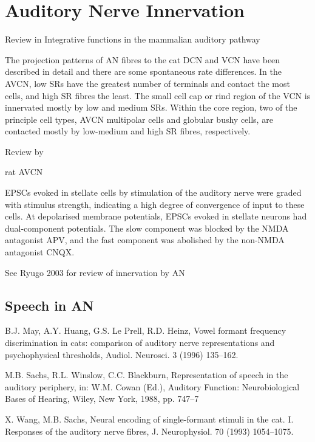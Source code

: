 \documentclass[10pt,a4paper]{article}
\begin{document}
\section{Auditory Nerve Innervation }

\citep{SmithSpirou:2002} 
Review in Integrative functions in the mammalian auditory pathway

The projection patterns of AN fibres to the cat DCN and VCN have been described in detail \citep{FeketeRouillerEtAl:1984,Liberman:1991,Liberman:1993,RoullierCronin-SchreiberEtAl:1986,Ryugo:1992,RyugoParks:2003}
and there are some spontaneous rate differences.  In the AVCN, low SRs have the
greatest number of terminals and contact the most cells, and high SR fibres the
least.  The small cell cap or rind region of the VCN is innervated mostly by low
and medium SRs.  Within the core region, two of the principle cell types, AVCN
multipolar cells and globular bushy cells, are contacted mostly by low-medium
and high SR fibres, respectively.

Review by \citep{Parks:2000}

\citep{PerneyKaczmarek:1997}

\citep{IsaacsonWalmsley:1995} rat AVCN

EPSCs evoked in stellate cells by stimulation of the auditory nerve were graded
with stimulus strength, indicating a high degree of convergence of input to
these cells. At depolarised membrane potentials, EPSCs evoked in stellate
neurons had dual-component potentials.  The slow component was blocked by the
NMDA antagonist APV, and the fast component was abolished by the non-NMDA
antagonist CNQX.

See Ryugo 2003 for review of innervation by AN

\subsection{Speech in AN}
B.J. May, A.Y. Huang, G.S. Le Prell, R.D. Heinz, Vowel formant
frequency discrimination in cats: comparison of auditory nerve
representations and psychophysical thresholds, Audiol. Neurosci. 3
(1996) 135--162.

M.B. Sachs, R.L. Winslow, C.C. Blackburn, Representation of
speech in the auditory periphery, in: W.M. Cowan (Ed.), Auditory
Function: Neurobiological Bases of Hearing, Wiley, New York,
1988, pp. 747--7

X. Wang, M.B. Sachs, Neural encoding of single-formant stimuli in
the cat. I. Responses of the auditory nerve fibres, J. Neurophysiol.
70 (1993) 1054--1075.
\end{document}
